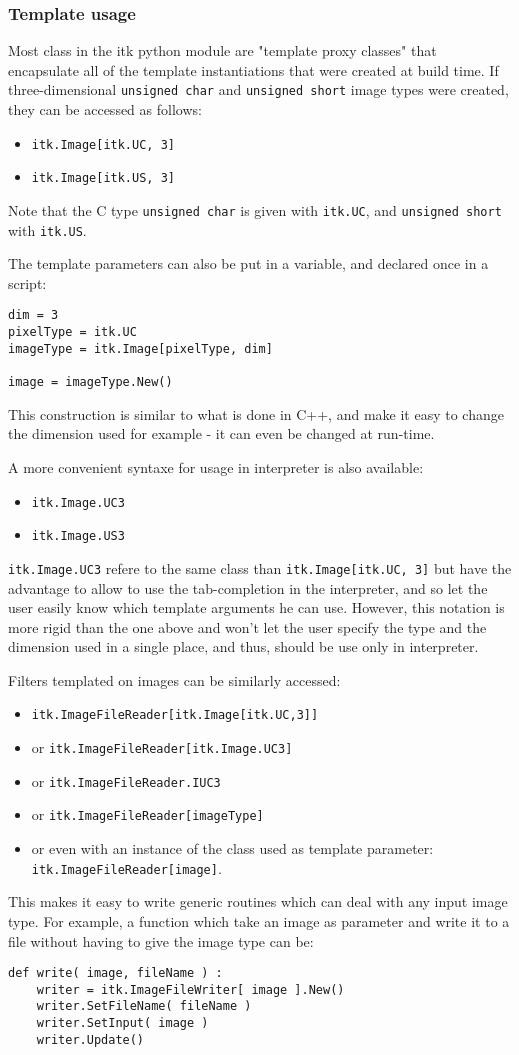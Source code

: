 \documentclass{InsightArticle}
\begin{document}
     \subsubsection{Template usage}
Most class in the itk python module are "template proxy classes" that
encapsulate all of the template instantiations that were created at build time.
If three-dimensional \verb$unsigned char$ and \verb$unsigned short$ image types were created,
they can be accessed as follows:
\begin{itemize}
  \item \verb$itk.Image[itk.UC, 3]$
  \item \verb$itk.Image[itk.US, 3]$
\end{itemize}
Note that the C type \verb$unsigned char$ is given with \verb$itk.UC$, and \verb$unsigned short$
with \verb$itk.US$.

The template parameters can also be put in a variable, and declared once
in a script:
\begin{verbatim}
dim = 3
pixelType = itk.UC
imageType = itk.Image[pixelType, dim]

image = imageType.New()
\end{verbatim}
This construction is similar to what is done in C++, and make it easy to change
the dimension used for example - it can even be changed at run-time.

A more convenient syntaxe for usage in interpreter is also available:
\begin{itemize}
  \item \verb$itk.Image.UC3$
  \item \verb$itk.Image.US3$
\end{itemize}
\verb$itk.Image.UC3$ refere to the same class than \verb$itk.Image[itk.UC, 3]$
but have the advantage to allow to use the tab-completion in the interpreter,
and so let the user easily know which template arguments he can use.
However, this notation is more rigid than the one above and won't let the user
specify the type and the dimension used in a single place, and thus,
should be use only in interpreter.

Filters templated on images can be similarly accessed:
\begin{itemize}
  \item \verb$itk.ImageFileReader[itk.Image[itk.UC,3]]$
  \item or \verb$itk.ImageFileReader[itk.Image.UC3]$
  \item or \verb$itk.ImageFileReader.IUC3$
  \item or \verb$itk.ImageFileReader[imageType]$
  \item or even with an instance of the class used as template parameter: \verb$itk.ImageFileReader[image]$.
\end{itemize}
This makes it easy to write generic routines which
can deal with any input image type. For example, a function which take an image
as parameter and write it to a file without having to give the image type can be:
\begin{verbatim}
def write( image, fileName ) :
    writer = itk.ImageFileWriter[ image ].New()
    writer.SetFileName( fileName )
    writer.SetInput( image )
    writer.Update()
\end{verbatim}
\end{document}
